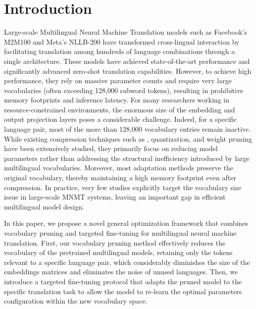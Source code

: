 \documentclass{article}
\begin{document}
	\section{Introduction}
	Large-scale Multilingual Neural Machine Translation models such as Facebook's M2M100
	and Meta's NLLB-200 have transformed cross-lingual interaction by facilitating translation
	among hundreds of language combinations through a single architecture. These models have
	achieved state-of-the-art performance and significantly advanced zero-shot translation
	capabilities. However, to achieve high performance, they rely on massive parameter counts
	and require very large vocabularies (often exceeding 128,000 subword tokens), resulting in
	prohibitive memory footprints and inference latency. For many researchers working in
	resource-constrained environments, the enormous size of the embedding and output projection
	layers poses a considerable challenge. Indeed, for a specific language pair, most of the more
	than 128,000 vocabulary entries remain inactive. While existing compression techniques such
	as 
	, quantization, and weight pruning have been extensively studied,
	they primarily focus on reducing model parameters rather than addressing the structural
	inefficiency introduced by large multilingual vocabularies. Moreover, most adaptation
	methods preserve the original vocabulary, thereby maintaining a high memory footprint even
	after compression. In practice, very few studies explicitly target the vocabulary size issue in
	large-scale MNMT systems, leaving an important gap in efficient multilingual model design.
	
	In this paper, we propose a novel general optimization framework that combines vocabulary
	pruning and targeted fine-tuning for multilingual neural machine translation. First, our
	vocabulary pruning method effectively reduces the vocabulary of the pretrained multilingual
	models, retaining only the tokens relevant to a specific language pair, which considerably
	diminishes the size of the embeddings matrices and eliminates the noise of unused languages.
	Then, we introduce a targeted fine-tuning protocol that adapts the pruned model to the
	specific translation task to allow the model to re-learn the optimal parameters configuration
	within the new vocabulary space.
	
\end{document}
